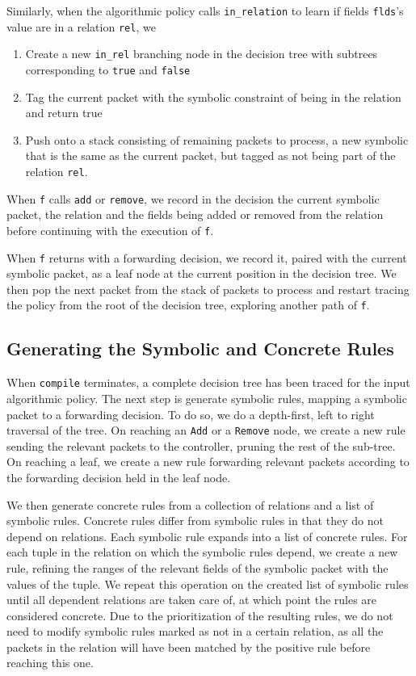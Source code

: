 \documentclass[nocopyrightspace]{sigplanconf}
\begin{document}
Similarly, when the algorithmic policy calls \lstinline|in_relation| to learn if fields \lstinline|flds|'s value are in a relation \lstinline|rel|, we
\begin{enumerate}
  \item Create a new \lstinline|in_rel| branching node in the decision tree with subtrees corresponding to \lstinline|true| and \lstinline|false|
  \item Tag the current packet with the symbolic constraint of being in the relation and return true
  \item Push onto a stack consisting of remaining packets to process, a new symbolic that is the same as the current packet, but tagged as not being part of the relation \lstinline|rel|.
\end{enumerate}
When \lstinline|f| calls \lstinline|add| or \lstinline|remove|, we record in the decision the current symbolic packet, the relation and the fields being added or removed from the relation before continuing with the execution of \lstinline|f|.





When \lstinline|f| returns with a forwarding decision, we record it, paired with the current symbolic packet, as a leaf node at the current position in the decision tree. We then pop the next packet from the stack of packets to process and restart tracing the policy from the root of the decision tree, exploring another path of \lstinline|f|.  

\subsection*{Generating the Symbolic and Concrete Rules}

When \lstinline|compile| terminates, a complete decision tree has been traced for the input algorithmic policy. The next step is generate symbolic rules, mapping a symbolic packet to a forwarding decision.
To do so, we do a depth-first, left to right traversal of the tree. On reaching an \lstinline|Add| or a \lstinline|Remove| node, we create a new rule sending the relevant packets to the controller, pruning the rest of the sub-tree. On reaching a leaf, we create a new rule forwarding relevant packets according to the forwarding decision held in the leaf node.

We then generate concrete rules from a collection of relations and a list of symbolic rules. Concrete rules differ from symbolic rules in that they do not depend on relations. Each symbolic rule expands into a list of concrete rules. For each tuple in the relation on which the symbolic rules depend, we create a new rule, refining the ranges of the relevant fields of the symbolic packet with the values of the tuple. We repeat this operation on the created list of symbolic rules until all dependent relations are taken care of, at which point the rules are considered concrete. Due to the prioritization of the resulting rules, we do not need to modify symbolic rules marked as not in a certain relation, as all the packets in the relation will have been matched by the positive rule before reaching this one.
\end{document}
